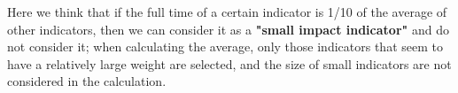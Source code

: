 Here we think that if the full time of a certain indicator is 1/10 of the average of other indicators, then we can consider it as a \textbf{"small impact indicator"} and do not consider it; when calculating the average, only those indicators that seem to have a relatively large weight are selected, and the size of small indicators are not considered in the calculation.
